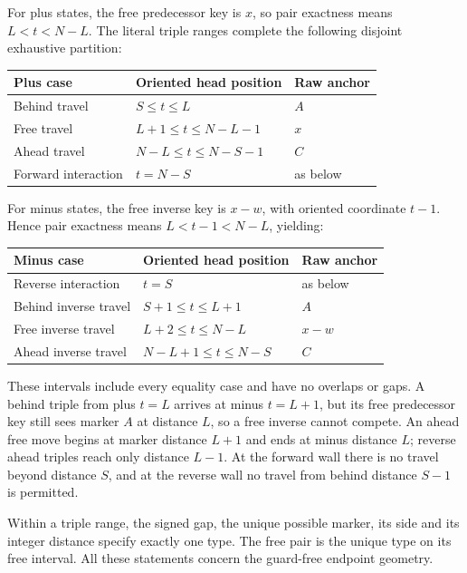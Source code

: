 \documentclass[11pt,a4paper]{article}
\numberwithin{equation}{section}
\begin{document}
For plus states, the free predecessor key is $x$, so pair exactness means $L<t<N-L$. The literal triple ranges complete the following disjoint exhaustive partition:
\begin{center}
\begin{tabular}{lll}\toprule
Plus case & Oriented head position & Raw anchor\\\midrule
Behind travel & $S\le t\le L$ & $A$\\
Free travel & $L+1\le t\le N-L-1$ & $x$\\
Ahead travel & $N-L\le t\le N-S-1$ & $C$\\
Forward interaction & $t=N-S$ & as below\\\bottomrule
\end{tabular}
\end{center}
For minus states, the free inverse key is $x-w$, with oriented coordinate $t-1$. Hence pair exactness means $L<t-1<N-L$, yielding:
\begin{center}
\begin{tabular}{lll}\toprule
Minus case & Oriented head position & Raw anchor\\\midrule
Reverse interaction & $t=S$ & as below\\
Behind inverse travel & $S+1\le t\le L+1$ & $A$\\
Free inverse travel & $L+2\le t\le N-L$ & $x-w$\\
Ahead inverse travel & $N-L+1\le t\le N-S$ & $C$\\\bottomrule
\end{tabular}
\end{center}
These intervals include every equality case and have no overlaps or gaps. A behind triple from plus $t=L$ arrives at minus $t=L+1$, but its free predecessor key still sees marker $A$ at distance $L$, so a free inverse cannot compete. An ahead free move begins at marker distance $L+1$ and ends at minus distance $L$; reverse ahead triples reach only distance $L-1$. At the forward wall there is no travel beyond distance $S$, and at the reverse wall no travel from behind distance $S-1$ is permitted.

Within a triple range, the signed gap, the unique possible marker, its side and its integer distance specify exactly one type. The free pair is the unique type on its free interval. All these statements concern the guard-free endpoint geometry.
\end{document}
